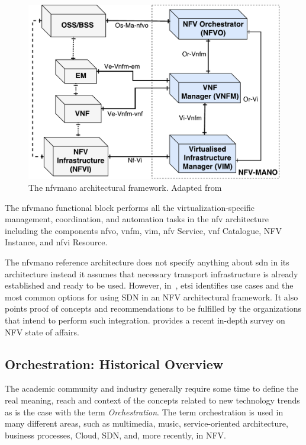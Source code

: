 \begin{figure}[t]
  \centering
  \includegraphics[scale=.4]{Figures/02_Background/MANO}
    \caption{The \gls{nfvmano} architectural framework. Adapted from~\cite{ETSIIndustrySpecificationGroupISGNFV2014NetworkOptions}}
    \label{mano}
\end{figure}

The \gls{nfvmano} functional block performs all the virtualization-specific management, coordination, and automation tasks in the \gls{nfv} architecture including the components \gls{nfvo}, \gls{vnfm}, \gls{vim}, \gls{nfv} Service, \gls{vnf} Catalogue, NFV Instance, and \gls{nfvi} Resource. 

The \gls{nfvmano} reference architecture does not specify anything about \gls{sdn} in its architecture instead it assumes that necessary transport infrastructure is already established and ready to be used. However, in~\cite{ETSINetworkFramework}, \gls{etsi} identifies use cases and the most common options for using SDN in an NFV architectural framework. It also points proof of concepts and recommendations to be fulfilled by the organizations that intend to perform such integration.
\cite{nfv-survey18} provides a recent in-depth survey on NFV state of affairs. 

\subsection{Orchestration: Historical Overview}

The academic community and industry generally require some time to define the real meaning, reach and context of the concepts related to new technology trends as is the case with the term \textit{Orchestration}. 
The term orchestration is used in many different areas, such as multimedia, music, service-oriented architecture, business processes, Cloud, SDN, and, more recently, in NFV.

